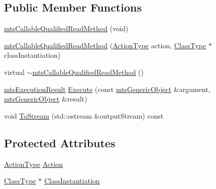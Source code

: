 \subsection*{Public Member Functions}
\begin{DoxyCompactItemize}
\item 
\hyperlink{classmts_callable_qualified_read_method_a098279bdc51bf3652822ab8e21061fb0}{mts\-Callable\-Qualified\-Read\-Method} (void)
\item 
\hyperlink{classmts_callable_qualified_read_method_a5e7503b7d68e7d603174b693a4c97616}{mts\-Callable\-Qualified\-Read\-Method} (\hyperlink{classmts_callable_qualified_read_method_ac6fc895837df0b66d84405f3ee01f153}{Action\-Type} action, \hyperlink{classmts_callable_qualified_read_method_a6cfee5c3c3c49c691c2f5176ea79d735}{Class\-Type} $\ast$class\-Instantiation)
\item 
virtual \hyperlink{classmts_callable_qualified_read_method_a6dde782b8c89d361aab0110b80befbbb}{$\sim$mts\-Callable\-Qualified\-Read\-Method} ()
\item 
\hyperlink{classmts_execution_result}{mts\-Execution\-Result} \hyperlink{classmts_callable_qualified_read_method_a834b39e11c3048d401ebbff94123f729}{Execute} (const \hyperlink{classmts_generic_object}{mts\-Generic\-Object} \&argument, \hyperlink{classmts_generic_object}{mts\-Generic\-Object} \&result)
\item 
void \hyperlink{classmts_callable_qualified_read_method_a279196a1b216f18f168c98a17dc89901}{To\-Stream} (std\-::ostream \&output\-Stream) const 
\end{DoxyCompactItemize}
\subsection*{Protected Attributes}
\begin{DoxyCompactItemize}
\item 
\hyperlink{classmts_callable_qualified_read_method_ac6fc895837df0b66d84405f3ee01f153}{Action\-Type} \hyperlink{classmts_callable_qualified_read_method_a50eaa90d9c1fb7ffa80933c21869c1b8}{Action}
\item 
\hyperlink{classmts_callable_qualified_read_method_a6cfee5c3c3c49c691c2f5176ea79d735}{Class\-Type} $\ast$ \hyperlink{classmts_callable_qualified_read_method_ae3b6667da77471acabf410afa3a541d1}{Class\-Instantiation}
\end{DoxyCompactItemize}


